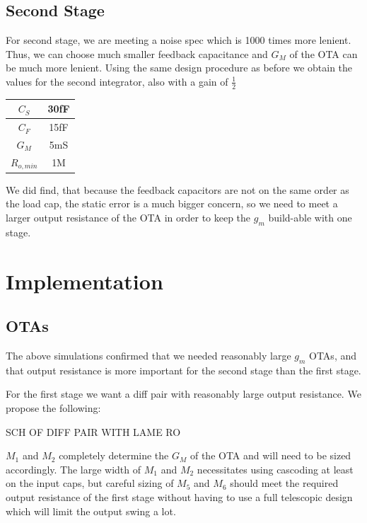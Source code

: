 \documentclass[conference]{IEEEtran}
\begin{document}
\subsection{Second Stage}

For second stage, we are meeting a noise spec which is 1000 times more lenient. Thus, we can choose much smaller feedback capacitance and $G_M$ of the OTA can be much more lenient. Using the same design procedure as before we obtain the values for the second integrator, also with a gain of $\frac{1}{2}$

\begin{center}
\begin{tabular}{|c|c|} 
\hline
$C_S$ & 30fF \\
\hline
$C_F$ & 15fF \\
\hline
$G_M$ & 5mS \\
\hline
$R_{o,min}$ & 1M \\
\hline
\end{tabular}
\end{center}

We did find, that because the feedback capacitors are not on the same order as the load cap, the static error is a much bigger concern, so we need to meet a larger output resistance of the OTA in order to keep the $g_m$ build-able with one stage.

\section{Implementation}

\subsection{OTAs}
The above simulations confirmed that we needed reasonably large $g_m$ OTAs, and that output resistance is more important for the second stage than the first stage.

For the first stage we want a diff pair with reasonably large output resistance. We propose the following:

SCH OF DIFF PAIR WITH LAME RO

$M_1$ and $M_2$ completely determine the $G_M$ of the OTA and will need to be sized accordingly. The large width of $M_1$ and $M_2$ necessitates using cascoding at least on the input caps, but careful sizing of $M_5$ and $M_6$ should meet the required output resistance of the first stage without having to use a full telescopic design which will limit the output swing a lot.
\end{document}
